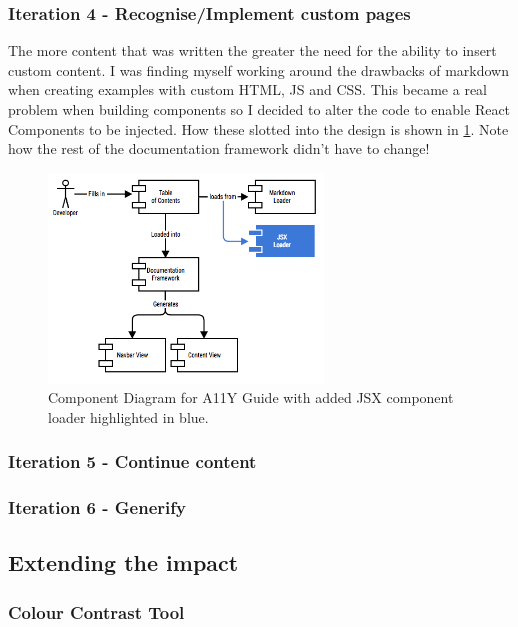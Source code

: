 \subsubsection{Iteration 4 - Recognise/Implement custom pages}
\label{sec:iteration_4}
The more content that was written the greater the need for the ability to
insert custom content. I was finding myself working around the drawbacks of
markdown when creating examples with custom HTML, JS and CSS. This became a
real problem when building components so I decided to alter the code to
enable React Components to be injected. How these slotted into the design is
shown in \ref{fig:allycomponent_2}. Note how the rest of the documentation
framework didn't have to change!

\begin{figure}[H]
\centering
\includegraphics[width=0.65\textwidth]{figures/documentation_design_2}
\captionsetup{justification=centering}
\caption[Short figure name.]{Component Diagram for A11Y Guide with added JSX
component loader highlighted in blue.
\label{fig:allycomponent_2}}
\end{figure}

\subsubsection{Iteration 5 - Continue content}
\subsubsection{Iteration 6 - Generify}

\subsection{Extending the impact}
\subsubsection{Colour Contrast Tool}
